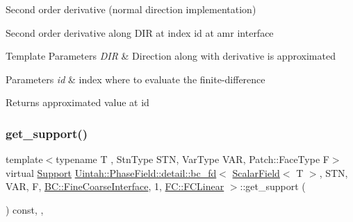 Second order derivative (normal direction implementation) 

Second order derivative along D\+IR at index id at amr interface


\begin{DoxyTemplParams}{Template Parameters}
{\em D\+IR} & Direction along with derivative is approximated \\
\hline
\end{DoxyTemplParams}

\begin{DoxyParams}{Parameters}
{\em id} & index where to evaluate the finite-\/difference \\
\hline
\end{DoxyParams}
\begin{DoxyReturn}{Returns}
approximated value at id 
\end{DoxyReturn}
\mbox{\label{classUintah_1_1PhaseField_1_1detail_1_1bc__fd_3_01ScalarField_3_01T_01_4_00_01STN_00_01VAR_00_01f836207db876ecd28bf65f631f79030f_afc1510ada00f1164ab696046f674d4ff}} 
\subsubsection{\texorpdfstring{get\+\_\+support()}{get\_support()}}
{\footnotesize\ttfamily template$<$typename T , Stn\+Type S\+TN, Var\+Type V\+AR, Patch\+::\+Face\+Type F$>$ \\
virtual \hyperlink{classUintah_1_1PhaseField_1_1Support}{Support} \hyperlink{classUintah_1_1PhaseField_1_1detail_1_1bc__fd}{Uintah\+::\+Phase\+Field\+::detail\+::bc\+\_\+fd}$<$ \hyperlink{structUintah_1_1PhaseField_1_1ScalarField}{Scalar\+Field}$<$ T $>$, S\+TN, V\+AR, F, \hyperlink{namespaceUintah_1_1PhaseField_a148fba372aa3be96fd6eede7a2fa10b5ad2d89be9637ff8b537fa4b6026c0e574}{B\+C\+::\+Fine\+Coarse\+Interface}, 1, \hyperlink{namespaceUintah_1_1PhaseField_aeb51fe956fe07f1487f5878f4039f27ca7460527a4d3065117218d8822530ed6a}{F\+C\+::\+F\+C\+Linear} $>$\+::get\+\_\+support (\begin{DoxyParamCaption}{ }\end{DoxyParamCaption}) const\hspace{0.3cm}{\ttfamily [inline]}, {\ttfamily [override]}, {\ttfamily [virtual]}}



